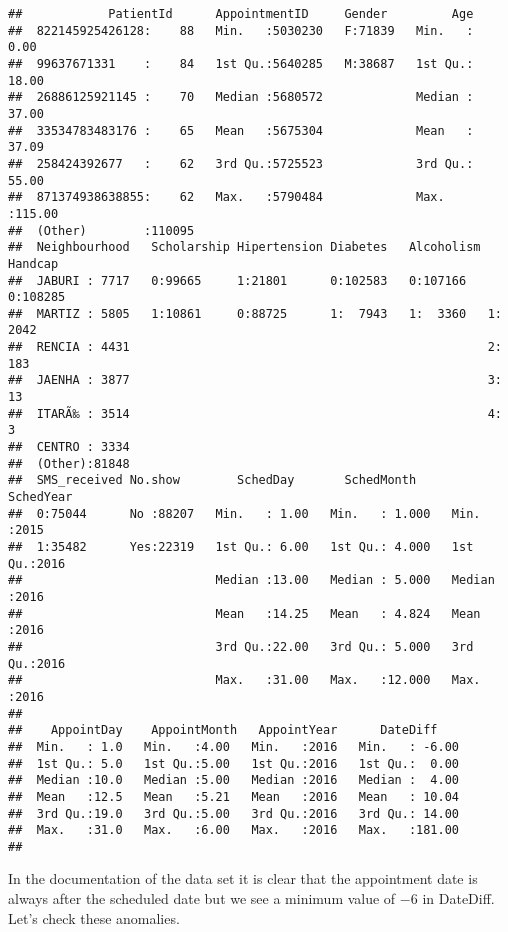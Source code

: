 \documentclass[]{article}
\begin{document}
\begin{verbatim}
##            PatientId      AppointmentID     Gender         Age        
##  822145925426128:    88   Min.   :5030230   F:71839   Min.   :  0.00  
##  99637671331    :    84   1st Qu.:5640285   M:38687   1st Qu.: 18.00  
##  26886125921145 :    70   Median :5680572             Median : 37.00  
##  33534783483176 :    65   Mean   :5675304             Mean   : 37.09  
##  258424392677   :    62   3rd Qu.:5725523             3rd Qu.: 55.00  
##  871374938638855:    62   Max.   :5790484             Max.   :115.00  
##  (Other)        :110095                                               
##  Neighbourhood   Scholarship Hipertension Diabetes   Alcoholism Handcap   
##  JABURI : 7717   0:99665     1:21801      0:102583   0:107166   0:108285  
##  MARTIZ : 5805   1:10861     0:88725      1:  7943   1:  3360   1:  2042  
##  RENCIA : 4431                                                  2:   183  
##  JAENHA : 3877                                                  3:    13  
##  ITARÃ‰ : 3514                                                  4:     3  
##  CENTRO : 3334                                                            
##  (Other):81848                                                            
##  SMS_received No.show        SchedDay       SchedMonth       SchedYear   
##  0:75044      No :88207   Min.   : 1.00   Min.   : 1.000   Min.   :2015  
##  1:35482      Yes:22319   1st Qu.: 6.00   1st Qu.: 4.000   1st Qu.:2016  
##                           Median :13.00   Median : 5.000   Median :2016  
##                           Mean   :14.25   Mean   : 4.824   Mean   :2016  
##                           3rd Qu.:22.00   3rd Qu.: 5.000   3rd Qu.:2016  
##                           Max.   :31.00   Max.   :12.000   Max.   :2016  
##                                                                          
##    AppointDay    AppointMonth   AppointYear      DateDiff     
##  Min.   : 1.0   Min.   :4.00   Min.   :2016   Min.   : -6.00  
##  1st Qu.: 5.0   1st Qu.:5.00   1st Qu.:2016   1st Qu.:  0.00  
##  Median :10.0   Median :5.00   Median :2016   Median :  4.00  
##  Mean   :12.5   Mean   :5.21   Mean   :2016   Mean   : 10.04  
##  3rd Qu.:19.0   3rd Qu.:5.00   3rd Qu.:2016   3rd Qu.: 14.00  
##  Max.   :31.0   Max.   :6.00   Max.   :2016   Max.   :181.00  
## 
\end{verbatim}

In the documentation of the data set it is clear that the appointment
date is always after the scheduled date but we see a minimum value of
\(-6\) in DateDiff. Let's check these anomalies.
\end{document}
